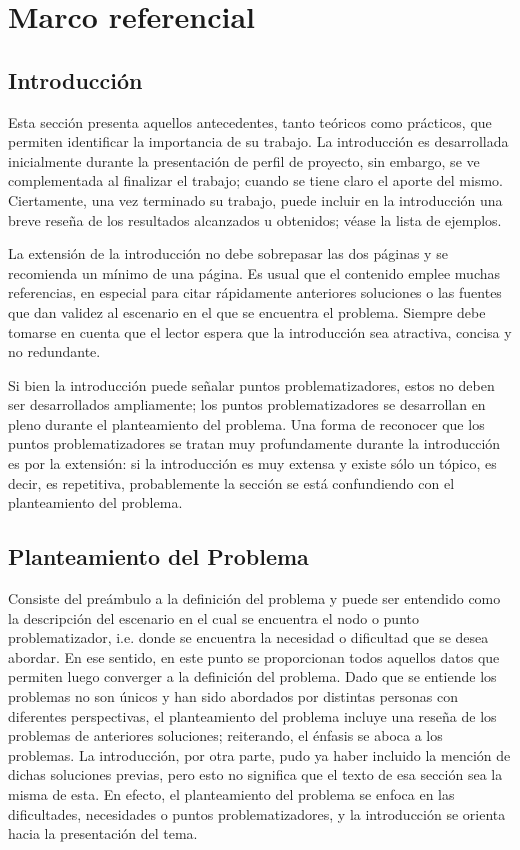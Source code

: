 \chapter{Marco referencial}
\label{sec:introduction}

\section{Introducción}
Esta sección presenta aquellos antecedentes, tanto teóricos como prácticos, que permiten identificar la importancia de su trabajo. La introducción es desarrollada inicialmente durante la presentación de perfil de proyecto, sin embargo, se ve complementada al finalizar el trabajo; cuando se tiene claro el aporte del mismo. Ciertamente, una vez terminado su trabajo, puede incluir en la introducción una breve reseña de los resultados alcanzados u obtenidos; véase la lista de ejemplos. 

La extensión de la introducción no debe sobrepasar las dos páginas y se recomienda un mínimo de una página. Es usual que el contenido emplee muchas referencias, en especial para citar rápidamente anteriores soluciones o las fuentes que dan validez al escenario en el que se encuentra el problema. Siempre debe tomarse en cuenta que el lector espera que la introducción sea atractiva, concisa y no redundante. 

Si bien la introducción puede señalar puntos problematizadores, estos no deben ser desarrollados ampliamente; los puntos problematizadores se desarrollan en pleno durante el planteamiento del problema. Una forma de reconocer que los puntos problematizadores se tratan muy profundamente durante la introducción es por la extensión: si la introducción es muy extensa y existe sólo un tópico, es decir, es repetitiva, probablemente la sección se está confundiendo con el planteamiento del problema. 

\section{Planteamiento del Problema}
Consiste del preámbulo a la definición del problema y puede ser entendido como la descripción del escenario en el cual se encuentra el nodo o punto problematizador, i.e. donde se encuentra la necesidad o dificultad que se desea abordar. En ese sentido, en este punto se proporcionan todos aquellos datos que permiten luego converger a la definición del problema.
Dado que se entiende los problemas no son únicos y han sido abordados por distintas personas con diferentes perspectivas, el planteamiento del problema incluye una reseña de los problemas de anteriores soluciones; reiterando, el énfasis se aboca a los problemas. La introducción, por otra parte, pudo ya haber incluido la mención de dichas soluciones previas, pero esto no significa que el texto de esa sección sea la misma de esta. En efecto, el planteamiento del problema se enfoca en las dificultades, necesidades o puntos problematizadores, y la introducción se orienta hacia la presentación del tema. 

